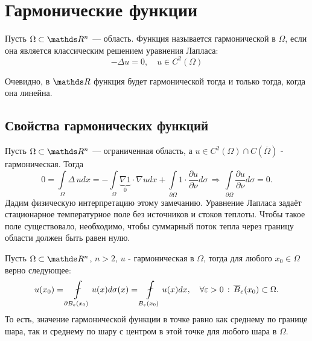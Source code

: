 
\section{Гармонические функции}
\begin{definition} Пусть $\Omega \subset \real^n$ --- область. Функция называется гармонической в $\Omega$, если она является классическим решением уравнения Лапласа:
$$-\Delta u = 0, \quad u \in C^2(\Omega)$$
\end{definition}
\begin{note}
Очевидно, в $\real$ функция будет гармонической тогда и только тогда, когда она линейна.
\end{note}

\subsection{Свойства гармонических функций}
\begin{note}
Пусть $\Omega \subset \real^n$ --- ограниченная область, а $u \in C^2(\Omega)\cap C(\overline{\Omega})$ - гармоническая. Тогда 
$$0 = \int \limits_\Omega \Delta \, u dx = -\int \limits_\Omega \underbrace {\nabla 1}_{0} \cdot \nabla u dx + \int \limits_{\partial\Omega} 1 \cdot \dfrac{\partial u}{\partial \nu}d\sigma\,\Rightarrow\, \int\limits_{\partial\Omega}\dfrac{\partial u}{\partial \nu}d\sigma = 0.$$
Дадим физическую интерпретацию этому замечанию. Уравнение Лапласа задаёт стационарное температурное поле без источников и стоков теплоты. Чтобы такое поле существовало, необходимо, чтобы суммарный поток тепла через границу области должен быть равен нулю.
\end{note}

\begin{theorem}
Пусть $\Omega \subset \real^n$, $n > 2$, $u$ - гармоническая в $\Omega$, тогда для любого $x_0 \in \Omega$ верно следующее:
$$u(x_0) = \fint \limits_{\partial B_\eps(x_0)} u(x) d\sigma(x) = \fint \limits_{B_\eps(x_0)} u(x)dx, \quad \forall \eps > 0 \,:\, \overline{B}_\eps(x_0)\subset\Omega.$$
То есть, значение гармонической функции в точке равно как среднему по границе шара, так и среднему по шару с центром в этой точке для любого шара в $\Omega$.
\end{theorem}

